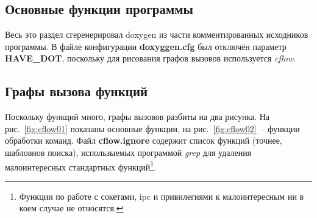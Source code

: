 \documentclass[a4paper,12pt]{report}
\begin{document}
\subsection{Основные функции программы}

Весь это раздел сгеренерировал doxygen из части комментированных исходников программы. В файле конфигурации \textbf{doxyggen.cfg} был отключён параметр \textbf{HAVE\_DOT}, поскольку для рисования графов вызовов используется \textit{cflow}.

% 

\subsection{Графы вызова функций}

Поскольку функций много, графы вызовов разбиты на два рисунка. На рис.~\ref{fig:cflow01} показаны основные функции, на рис.~\ref{fig:cflow02}~-- функции обработки команд. Файл \textbf{cflow.ignore} содержит список функций (точнее, шабловнов поиска), использыемых программой \textit{grep} для удаления малоинтересных стандартных функций\footnote{Функции по работе с сокетами, ipc и привилегиями к малоинтересным ни в коем случае не относятся.}.
\end{document}
